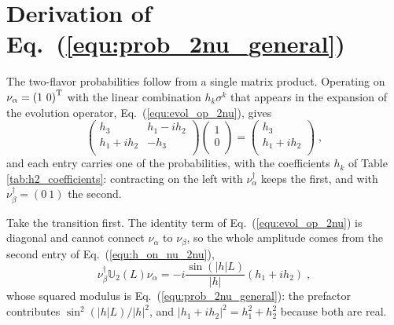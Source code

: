 \documentclass[final,5p,times,twocolumn,sort,compress]{elsarticle}
\newcommand{\eq}{Eq.}
\newcommand{\equ}[1]{\eq~(\ref{equ:#1})}
\begin{document}

\section{Derivation of \equ{prob_2nu_general}}
\label{app:derivation_prob_2nu_general}
\appresetfloats

The two-flavor probabilities follow from a single matrix product.  Operating on $\nu_\alpha = \left(1~0\right)^{\rm T}$ with the linear combination $h_k \sigma^k$ that appears in the expansion of the evolution operator, \equ{evol_op_2nu}, gives
\begin{equation}
 \label{equ:h_on_nu_2nu}
 \left(\begin{array}{cc}
  h_3      & h_1-ih_2 \\
  h_1+ih_2 & -h_3     \\
 \end{array}\right)
 \left(\begin{array}{c}
  1 \\
  0 \\
 \end{array}\right)
 =
 \left(\begin{array}{c}
  h_3      \\
  h_1+ih_2 \\
 \end{array}\right) \;,
\end{equation}
and each entry carries one of the probabilities, with the coefficients $h_k$ of Table \ref{tab:h2_coefficients}: contracting on the left with $\nu_\alpha^\dagger$ keeps the first, and with $\nu_\beta^\dagger = \left(0~1\right)$ the second.

Take the transition first.  The identity term of \equ{evol_op_2nu} is diagonal and cannot connect $\nu_\alpha$ to $\nu_\beta$, so the whole amplitude comes from the second entry of \equ{h_on_nu_2nu},
\begin{equation}
 \nu_\beta^\dagger \mathbb{U}_2(L) \nu_\alpha
 =
 -i \frac{\sin\left(\lvert h \rvert L\right)}{\lvert h \rvert}
 \left(h_1 + i h_2\right) \;,
\end{equation}
whose squared modulus is \equ{prob_2nu_general}: the prefactor contributes $\sin^2\left(\lvert h \rvert L\right)/\lvert h \rvert^2$, and $\lvert h_1 + i h_2 \rvert^2 = h_1^2 + h_2^2$ because both are real.
\end{document}
